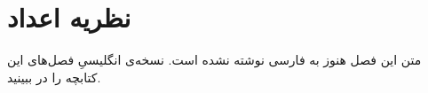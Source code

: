 \chapter{نظریه اعداد}
\label{ch:05-number-theory-fa-01}

متن این فصل هنوز به فارسی نوشته نشده است. نسخه‌ی انگلیسیِ فصل‌های این کتابچه را در  ببینید.
